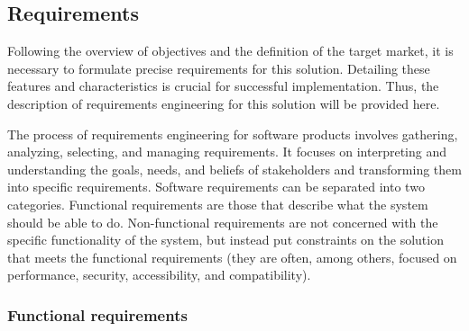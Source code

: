\subsection{Requirements}

Following the overview of objectives and the definition of the target market, it is necessary to formulate precise requirements for this solution. Detailing these features and characteristics is crucial for successful implementation. Thus, the description of requirements engineering for this solution will be provided here.

The process of requirements engineering for software products involves gathering, analyzing, selecting, and managing requirements. It focuses on interpreting and understanding the goals, needs, and beliefs of stakeholders and transforming them into specific requirements.
Software requirements can be separated into two categories. Functional requirements are those that describe what the system should be able to do. Non-functional requirements are not concerned with the specific functionality of the system, but instead put constraints on the solution that meets the functional requirements (they are often, among others, focused on performance, security, accessibility, and compatibility). \cite{Aurum2005}



\subsubsection{Functional requirements}

